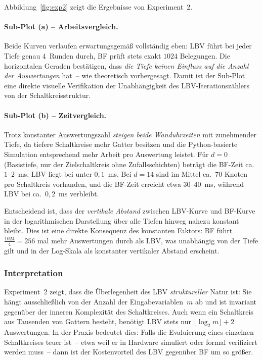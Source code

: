 ﻿\documentclass[a4paper,12pt]{article}
\theoremstyle{definition}
\begin{document}
Abbildung~\ref{fig:exp2} zeigt die Ergebnisse von Experiment~2.

\paragraph{Sub-Plot (a) -- Arbeitsvergleich.}
Beide Kurven verlaufen erwartungsgemäß vollständig eben: LBV führt bei jeder
Tiefe genau $4$~Runden durch, BF prüft stets exakt $1024$ Belegungen.  Die
horizontalen Geraden bestätigen, dass \emph{die Tiefe keinen Einfluss auf die
Anzahl der Auswertungen} hat~-- wie theoretisch vorhergesagt.  Damit ist der
Sub-Plot eine direkte visuelle Verifikation der Unabhängigkeit des LBV-Iterationszählers
von der Schaltkreisstruktur.

\paragraph{Sub-Plot (b) -- Zeitvergleich.}
Trotz konstanter Auswertungszahl \emph{steigen beide Wanduhrzeiten} mit
zunehmender Tiefe, da tiefere Schaltkreise mehr Gatter besitzen und die
Python-basierte Simulation entsprechend mehr Arbeit pro Auswertung leistet.
Für $d = 0$ (Basistiefe, nur der Zielschaltkreis ohne Zufallsschichten)
beträgt die BF-Zeit ca.\ $1$--$2$~ms, LBV liegt bei unter $0{,}1$~ms.
Bei $d = 14$ sind im Mittel ca.\ $70$ Knoten pro Schaltkreis vorhanden, und
die BF-Zeit erreicht etwa $30$--$40$~ms, während LBV bei ca.\ $0{,}2$~ms
verbleibt.

Entscheidend ist, dass der \emph{vertikale Abstand} zwischen LBV-Kurve und BF-Kurve
in der logarithmischen Darstellung über alle Tiefen hinweg nahezu konstant bleibt.
Dies ist eine direkte Konsequenz des konstanten Faktors: BF führt $\frac{1024}{4} = 256$
mal mehr Auswertungen durch als LBV, was unabhängig von der Tiefe gilt und in der
Log-Skala als konstanter vertikaler Abstand erscheint.

\subsubsection{Interpretation}

Experiment~2 zeigt, dass die Überlegenheit des LBV \emph{struktureller} Natur ist:
Sie hängt ausschließlich von der Anzahl der Eingabevariablen~$m$ ab und ist invariant
gegenüber der inneren Komplexität des Schaltkreises.  Auch wenn ein Schaltkreis aus
Tausenden von Gattern besteht, benötigt LBV stets nur $\lfloor\log_2 m\rfloor + 2$
Auswertungen.  In der Praxis bedeutet dies: Falls die Evaluierung eines einzelnen
Schaltkreises teuer ist~-- etwa weil er in Hardware simuliert oder formal verifiziert
werden muss~-- dann ist der Kostenvorteil des LBV gegenüber BF um so größer.
\end{document}
